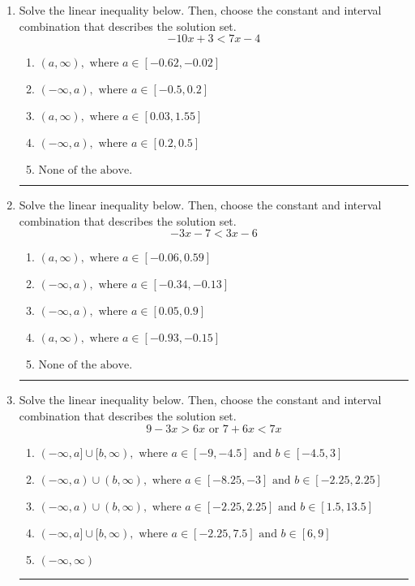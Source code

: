 \documentclass[14pt]{extbook}
\newcommand{\litem}[1]{\item#1\hspace*{-1cm}\rule{\textwidth}{0.4pt}}
\begin{document}
\begin{enumerate}
{\begin{enumerate}[label=\Alph*.]
\end{enumerate} }
\litem{
Solve the linear inequality below. Then, choose the constant and interval combination that describes the solution set.\[ -10x + 3 < 7x -4 \]\begin{enumerate}[label=\Alph*.]
\item \( (a, \infty), \text{ where } a \in [-0.62, -0.02] \)
\item \( (-\infty, a), \text{ where } a \in [-0.5, 0.2] \)
\item \( (a, \infty), \text{ where } a \in [0.03, 1.55] \)
\item \( (-\infty, a), \text{ where } a \in [0.2, 0.5] \)
\item \( \text{None of the above}. \)

\end{enumerate} }
\litem{
Solve the linear inequality below. Then, choose the constant and interval combination that describes the solution set.\[ -3x -7 < 3x -6 \]\begin{enumerate}[label=\Alph*.]
\item \( (a, \infty), \text{ where } a \in [-0.06, 0.59] \)
\item \( (-\infty, a), \text{ where } a \in [-0.34, -0.13] \)
\item \( (-\infty, a), \text{ where } a \in [0.05, 0.9] \)
\item \( (a, \infty), \text{ where } a \in [-0.93, -0.15] \)
\item \( \text{None of the above}. \)

\end{enumerate} }
\litem{
Solve the linear inequality below. Then, choose the constant and interval combination that describes the solution set.\[ 9 - 3 x > 6 x \text{ or } 7 + 6 x < 7 x \]\begin{enumerate}[label=\Alph*.]
\item \( (-\infty, a] \cup [b, \infty), \text{ where } a \in [-9, -4.5] \text{ and } b \in [-4.5, 3] \)
\item \( (-\infty, a) \cup (b, \infty), \text{ where } a \in [-8.25, -3] \text{ and } b \in [-2.25, 2.25] \)
\item \( (-\infty, a) \cup (b, \infty), \text{ where } a \in [-2.25, 2.25] \text{ and } b \in [1.5, 13.5] \)
\item \( (-\infty, a] \cup [b, \infty), \text{ where } a \in [-2.25, 7.5] \text{ and } b \in [6, 9] \)
\item \( (-\infty, \infty) \)


\end{enumerate}}
\end{enumerate}
\end{document}
